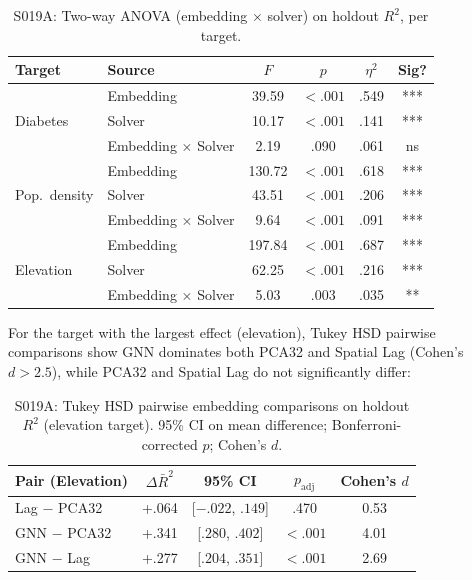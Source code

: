\documentclass{article}
\begin{document}
\begin{table}[htbp]
\centering
\small
\caption{S019A: Two-way ANOVA (embedding $\times$ solver) on holdout $R^2$, per target.}
\label{tab:s019a_anova}
\begin{tabular}{ll|cccc}
\toprule
\textbf{Target} & \textbf{Source} & $F$ & $p$ & $\eta^2$ & \textbf{Sig?} \\
\midrule
\multirow{3}{*}{Diabetes}
& Embedding           & 39.59 & ${<}.001$ & .549 & *** \\
& Solver              & 10.17 & ${<}.001$ & .141 & *** \\
& Embedding $\times$ Solver & 2.19 & .090 & .061 & ns \\
\midrule
\multirow{3}{*}{Pop.\ density}
& Embedding           & 130.72 & ${<}.001$ & .618 & *** \\
& Solver              & 43.51 & ${<}.001$ & .206 & *** \\
& Embedding $\times$ Solver & 9.64 & ${<}.001$ & .091 & *** \\
\midrule
\multirow{3}{*}{Elevation}
& Embedding           & 197.84 & ${<}.001$ & .687 & *** \\
& Solver              & 62.25 & ${<}.001$ & .216 & *** \\
& Embedding $\times$ Solver & 5.03 & .003 & .035 & ** \\
\bottomrule
\end{tabular}
\end{table}

For the target with the largest effect (elevation), Tukey HSD pairwise comparisons show GNN dominates both PCA32 and Spatial Lag (Cohen's $d > 2.5$), while PCA32 and Spatial Lag do not significantly differ:

\begin{table}[htbp]
\centering
\small
\caption{S019A: Tukey HSD pairwise embedding comparisons on holdout $R^2$ (elevation target). 95\% CI on mean difference; Bonferroni-corrected $p$; Cohen's $d$.}
\label{tab:s019a_tukey}
\begin{tabular}{l|cccc}
\toprule
\textbf{Pair (Elevation)} & $\Delta \bar{R}^2$ & 95\% CI & $p_{\text{adj}}$ & Cohen's $d$ \\
\midrule
Lag $-$ PCA32 & +.064 & [$-.022$, $.149$] & .470 & 0.53 \\
GNN $-$ PCA32 & +.341 & [$.280$, $.402$] & ${<}.001$ & 4.01 \\
GNN $-$ Lag   & +.277 & [$.204$, $.351$] & ${<}.001$ & 2.69 \\
\bottomrule
\end{tabular}
\end{table}
\end{document}
